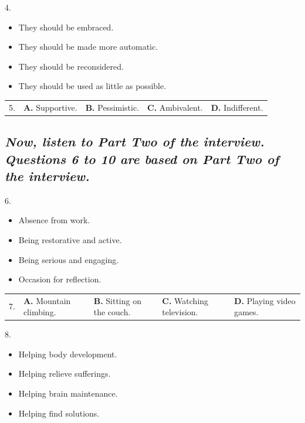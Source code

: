 \documentclass[UTF8,11pt]{ctexart}
\begin{document}
4.


\begin{itemize}[leftmargin=2em,itemsep=.2em,topsep=.4em]\item[A.] They should be embraced.
\item[B.] They should be made more automatic.
\item[C.] They should be reconsidered.
\item[D.] They should be used as little as possible.
\end{itemize}

\noindent\begin{tabularx}{\linewidth}{@{}lXXXX@{}}5. & \textbf{A.} Supportive. & \textbf{B.} Pessimistic. & \textbf{C.} Ambivalent. & \textbf{D.} Indifferent.\\\end{tabularx}\par

\subsection*{\textbf{\textit{Now, listen to Part Two of the interview. Questions 6 to 10 are based on Part Two of the interview.}}}


6.


\begin{itemize}[leftmargin=2em,itemsep=.2em,topsep=.4em]\item[A.] Absence from work.
\item[B.] Being restorative and active.
\item[C.] Being serious and engaging.
\item[D.] Occasion for reflection.
\end{itemize}

\noindent\begin{tabularx}{\linewidth}{@{}lXXXX@{}}7. & \textbf{A.} Mountain climbing. & \textbf{B.} Sitting on the couch. & \textbf{C.} Watching television. & \textbf{D.} Playing video games.\\\end{tabularx}\par

8.


\begin{itemize}[leftmargin=2em,itemsep=.2em,topsep=.4em]\item[A.] Helping body development.
\item[B.] Helping relieve sufferings.
\item[C.] Helping brain maintenance.
\item[D.] Helping find solutions.
\end{itemize}
\end{document}
